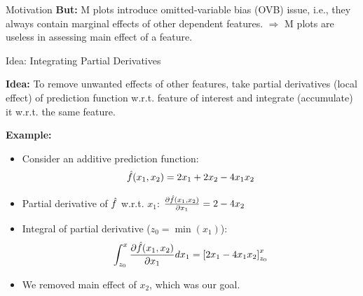 \documentclass[11pt,compress,t,notes=noshow, aspectratio=169, xcolor=table]{beamer}
\begin{document}
\begin{frame}{Motivation}
\textbf{But:} M plots introduce omitted-variable bias (OVB) issue, i.e., they always contain marginal effects of other dependent features.
$\Rightarrow$ M plots are useless in assessing main effect of a feature.

\end{frame}




\begin{frame}{Idea: Integrating Partial Derivatives}

\textbf{Idea:} To remove unwanted effects of other features, take partial derivatives (local effect) of prediction function w.r.t. feature of interest and integrate (accumulate) it w.r.t. the same feature.

\lz

\textbf{Example:}
\begin{itemize}
\item Consider an additive prediction function: $$\fh(x_1, x_2) = 2x_1 + 2x_2 - 4x_1 x_2$$
\item Partial derivative of $\fh$ w.r.t. $x_1$:
$\frac{\partial \fh(x_1, x_2)}{\partial x_1} = 2 - 4x_2$
\item Integral of partial derivative ($z_0 = \min(x_1)$):
$$\int_{z_0}^{x} \frac{\partial \fh(x_1, x_2)}{\partial x_1} dx_1 = \left[2x_1 - 4x_1 x_2\right]_{z_0}^{x}$$
\item We removed main effect of $x_2$, which was our goal.
\end{itemize}
\end{frame}
\end{document}
